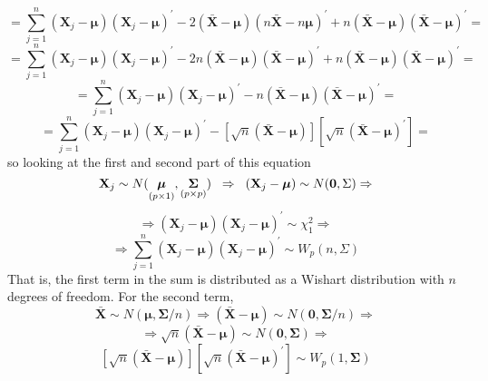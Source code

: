 \documentclass{article}
\begin{document}
    \[
        =
        \scriptstyle{
        \sum_{j=1}^{n}{
            (\textbf{X}_{j} - \bm{\mu}){(\textbf{X}_{j} - \bm{\mu})}^{\prime}
        }
        -
        2
        (\bar{\textbf{X}} - \bm{\mu})
        {(n\bar{\textbf{X}} - n\bm{\mu})}^{\prime}
        +
        n
        (\bar{\textbf{X}} - \bm{\mu}){(\bar{\textbf{X}} - \bm{\mu})}^{\prime}
        }
        =
    \]
    \[
        =
        \scriptstyle{
        \sum_{j=1}^{n}{
            (\textbf{X}_{j} - \bm{\mu}){(\textbf{X}_{j} - \bm{\mu})}^{\prime}
        }
        -
        2n
        (\bar{\textbf{X}} - \bm{\mu})
        {(\bar{\textbf{X}} - \bm{\mu})}^{\prime}
        +
        n
        (\bar{\textbf{X}} - \bm{\mu}){(\bar{\textbf{X}} - \bm{\mu})}^{\prime}
        }
        =
    \]
    \[
        =
        \sum_{j=1}^{n}{
            (\textbf{X}_{j} - \bm{\mu}){(\textbf{X}_{j} - \bm{\mu})}^{\prime}
        }
        -
        n
        (\bar{\textbf{X}} - \bm{\mu})
        {(\bar{\textbf{X}} - \bm{\mu})}^{\prime}
        =
    \]
    \[
        =
        \sum_{j=1}^{n}{
            (\textbf{X}_{j} - \bm{\mu}){(\textbf{X}_{j} - \bm{\mu})}^{\prime}
        }
        -
        \left[
            \sqrt{n}
            (\bar{\textbf{X}} - \bm{\mu})
        \right]
        \left[
            \sqrt{n}
            {(\bar{\textbf{X}} - \bm{\mu})}^{\prime}
        \right]
        =
    \]
    so looking at the first and second part of this equation
    \[
        \textbf{X}_{j}
        \sim
        N(\underset{(p \times 1)}{\bm{\mu}}, \underset{(p \times p)}{\bm{\Sigma}})
        \hspace{0.2cm}
        \Rightarrow
        \hspace{0.2cm}
        (\textbf{X}_{j} - \bm{\mu})
        \sim
        N(\textbf{0}, \Sigma)
        \Rightarrow
    \]
    \[
        \Rightarrow
        (\textbf{X}_{j} - \bm{\mu}){(\textbf{X}_{j} - \bm{\mu})}^{\prime}
        \sim
        \chi_{1}^{2}
        \Rightarrow
    \]
    \[
        \Rightarrow
        \sum_{j=1}^{n}{
            (\textbf{X}_{j} - \bm{\mu}){(\textbf{X}_{j} - \bm{\mu})}^{\prime}
        }
        \sim
        W_{p}(n, \Sigma)
    \]
    That is, the first term in the sum is distributed as a Wishart distribution with $n$ degrees of freedom. For the second term,
    \[
        \bar{\textbf{X}}
        \sim
        N(\bm{\mu}, \bm{\Sigma}/n)
        \Rightarrow
        (\bar{\textbf{X}} - \bm{\mu})
        \sim
        N(\textbf{0}, \bm{\Sigma}/n)
        \Rightarrow
    \]
    \[
        \Rightarrow
        \sqrt{n}
        (\bar{\textbf{X}} - \bm{\mu})
        \sim
        N(\textbf{0}, \bm{\Sigma})
        \Rightarrow
    \]
    \[
        \left[
            \sqrt{n}
            (\bar{\textbf{X}} - \bm{\mu})
        \right]
        \left[
            \sqrt{n}
            {(\bar{\textbf{X}} - \bm{\mu})}^{\prime}
        \right]
        \sim
        W_{p}(1, \bm{\Sigma})
    \]
\end{document}
